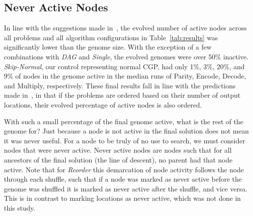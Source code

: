 \documentclass[journal]{IEEEtran}
\begin{document}
\begin{comment}
Using the algorithm given in Figure~\ref{fig:simplify}, we can determine the
absolute minimum set of nodes in a genome's solution that are necessary to
reproduce the original output of that genome.  This allows us to discuss
the usefulness of each node as either being part of the minimum solution, a
duplicate of a node in the minimum solution, or irrelevant to the solution.
As such we can then examine how redundancy is being used, how frequently useful
structures exist in the inactive nodes, and how useful nodes are constructed by evolution.
This algorithm can also be used to construct simplified genomes when combined
with the algorithm given in Figure~\ref{fig:reorder}.
\end{comment}
\subsection{Never Active Nodes}
In line with the suggestions made in~\cite{miller:2006:redundancy}, the evolved
number of active nodes across all problems and all algorithm configurations
in Table~\ref{tab:results}
was significantly lower than the genome size.  With the exception of a few combinations
with \emph{DAG} and \emph{Single}, the evolved genomes were over 50\% inactive.
\emph{Skip-Normal}, our control representing normal CGP, had only 1\%, 3\%, 20\%,
and 9\% of nodes in the genome active in the median runs of Parity, Encode, Decode,
and Multiply, respectively.  These final results fall in line with the predictions
made in~\cite{goldman:2013:ordering}, in that if the problems are ordered based on
their number of output locations, their evolved percentage of active nodes is also ordered.

With such a small percentage of the final genome active, what is the rest of the
genome for?
Just because a node is not active in the final solution does not mean it was never
useful.  For a node to be truly of no use to search, we must consider nodes that
were never active.  Never active nodes are nodes such that for all ancestors of the
final solution (the line of descent), no parent had that node active.  Note that
for \emph{Reorder} this demarcation of node activity follows the node through
each shuffle, such that if a node was marked as never active before the genome
was shuffled it is marked as never active after the shuffle, and vice versa.
This is in contrast to marking locations as never active, which was not done in
this study.
\end{document}

